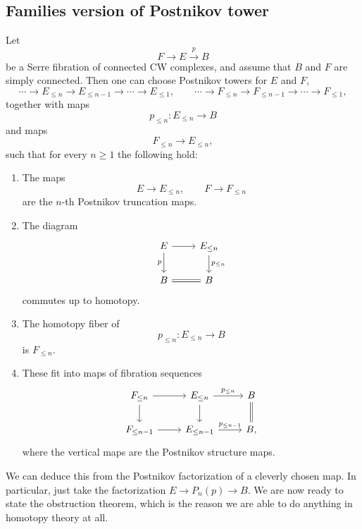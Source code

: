 \documentclass[12pt]{article}
\begin{document}
\subsection{Families version of Postnikov tower}
\begin{proposition}
Let
\[
F \longrightarrow E \xrightarrow{p} B
\]
be a Serre fibration of connected CW complexes, and assume that \(B\) and \(F\) are simply connected. Then one can choose Postnikov towers for \(E\) and \(F\),
\[
\cdots \longrightarrow E_{\le n} \longrightarrow E_{\le n-1} \longrightarrow \cdots \longrightarrow E_{\le 1},
\qquad
\cdots \longrightarrow F_{\le n} \longrightarrow F_{\le n-1} \longrightarrow \cdots \longrightarrow F_{\le 1},
\]
together with maps
\[
p_{\le n}\colon E_{\le n}\longrightarrow B
\]
and maps
\[
F_{\le n}\longrightarrow E_{\le n},
\]
such that for every \(n\ge 1\) the following hold:
\begin{enumerate}
    \item The maps
    \[
    E\longrightarrow E_{\le n},
    \qquad
    F\longrightarrow F_{\le n}
    \]
    are the \(n\)-th Postnikov truncation maps.
    \item The diagram
    \[
    \begin{tikzcd}
    E \arrow[r] \arrow[d,"p"'] & E_{\le n} \arrow[d,"p_{\le n}"] \\
    B \arrow[r,equal] & B
    \end{tikzcd}
    \]
    commutes up to homotopy.

    \item The homotopy fiber of
    \[
    p_{\le n}\colon E_{\le n}\longrightarrow B
    \]
    is \(F_{\le n}\).
    \item These fit into maps of fibration sequences
    \[
    \begin{tikzcd}
    F_{\le n} \arrow[r] \arrow[d] & E_{\le n} \arrow[r,"p_{\le n}"] \arrow[d] & B \arrow[d,equal] \\
    F_{\le n-1} \arrow[r] & E_{\le n-1} \arrow[r,"p_{\le n-1}"] & B,
    \end{tikzcd}
    \]
    where the vertical maps are the Postnikov structure maps.
\end{enumerate}
\end{proposition}
We can deduce this from the Postnikov factorization of a cleverly chosen map. In particular, just take the factorization $E \to P_n(p) \to B$. We are now ready to state the obstruction theorem, which is the reason we are able to do anything in homotopy theory at all.
\end{document}
